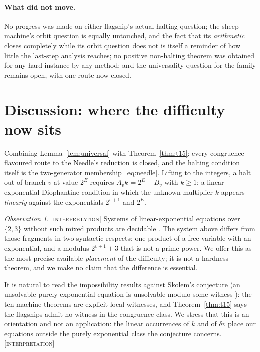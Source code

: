 \documentclass[11pt]{article}
\theoremstyle{definition}
\theoremstyle{remark}
\newtheorem{observation}[theorem]{Observation}
\newcommand{\Interp}{\textsc{[interpretation]}}
\begin{document}
\paragraph{What did not move.}
No progress was made on either flagship's actual halting question; the sheep
machine's orbit question is equally untouched, and the fact that its
\emph{arithmetic} closes completely while its orbit question does not is
itself a reminder of how little the last-step analysis reaches; no positive
non-halting theorem was obtained for any hard instance by any method; and the
universality question for the family remains open, with one route now closed.

\section{Discussion: where the difficulty now sits}
\label{sec:discussion}

Combining Lemma~\ref{lem:universal} with Theorem~\ref{thm:t15}: every
congruence-flavoured route to the Needle's reduction is closed, and the halting
condition itself is the two-generator membership~\eqref{eq:needle}.  Lifting to
the integers, a halt out of branch $v$ at value $2^{E}$ requires
$A_vk=2^{E}-B_v$ with $k\ge1$: a linear-exponential Diophantine condition in
which the unknown multiplier $k$ appears \emph{linearly} against the
exponentials $2^{v+1}$ and $2^{E}$.

\begin{observation}\label{obs:address}
\Interp{}\; Systems of linear-exponential equations over $\{2,3\}$ without such
mixed products are decidable
\cite{dong-shafrir,chistikov-mansutti-starchak}.  The system above differs from
those fragments in two syntactic respects: one product of a free variable with
an exponential, and a modulus $2^{v+1}+3$ that is not a prime power.  We offer
this as the most precise available \emph{placement} of the difficulty; it is
not a hardness theorem, and we make no claim that the difference is essential.
\end{observation}

It is natural to read the impossibility results against Skolem's conjecture
(an unsolvable purely exponential equation is unsolvable modulo some witness
\cite{bertok-hajdu}): the ten machine theorems are explicit local witnesses,
and Theorem~\ref{thm:t15} says the flagships admit no witness in the congruence
class.  We stress that this is an orientation and not an application: the
linear occurrences of $k$ and of $\delta v$ place our equations outside the
purely exponential class the conjecture concerns. \Interp{}
\end{document}
